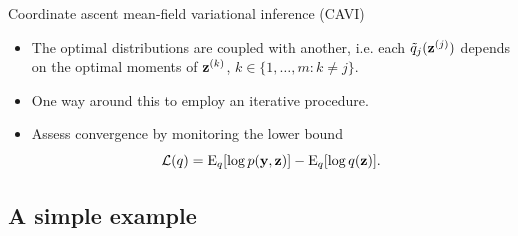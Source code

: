 \begin{frame}{Coordinate ascent mean-field variational inference (CAVI)}
  \vspace{-5pt}
  \begin{itemize}\setlength\itemsep{0.4em}
    \item The optimal distributions are coupled with another, i.e. each $\tilde q_j({\mathbf z}^{(j)})$ depends on the optimal moments of ${\mathbf z}^{(k)}$, $k \in \{1,\dots,m:k \neq j\}$.
    \item One way around this to employ an iterative procedure.
    \item Assess convergence by monitoring the lower bound
    \[
      {\mathcal L}(q) = \operatorname{E}_{ q}[\log p({\mathbf y}, {\mathbf z})] - \operatorname{E}_{ q}[\log q({\mathbf z})].
    \]
  \end{itemize}
  \vspace{-12pt}
    \begin{center}
  \end{center}
\end{frame}

\subsection{A simple example}

